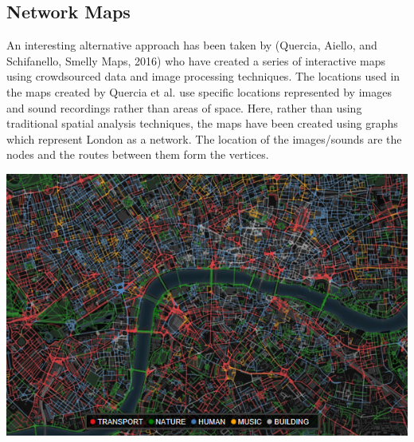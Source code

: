 \subsection{Network Maps}
An interesting alternative approach has been taken by (Quercia, Aiello, and Schifanello, Smelly Maps, 2016) who have created a series of interactive maps using crowdsourced data and image processing techniques. The locations used in the maps created by Quercia et al. use specific locations represented by images and sound recordings rather than areas of space. Here, rather than using traditional spatial analysis techniques, the maps have been created using graphs which represent London as a network. The location of the images/sounds are the nodes and the routes between them form the vertices.

\includegraphics[scale=0.8]{figures/noise_network} %

